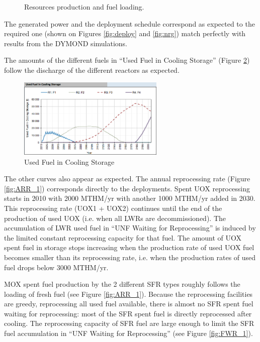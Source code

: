 \documentclass[12pt]{article}
\begin{document}
\begin{figure}[h!]
    \centering
    \caption{Resources production and fuel loading.\label{fig:ResourceUsed} }
\end{figure}

The generated power and the deployment schedule correspond as expected to the
required one (shown on Figures \ref{fig:deploy} and \ref{fig:nrg}) match
perfectly with results from the DYMOND simulations.

The amounts of the different fuels in ``Used Fuel in Cooling Storage'' (Figure
\ref{fig:UFCS_1}) follow the discharge of the different reactors as expected.

\begin{figure}[h!]
    \centering
    \includegraphics[width=0.62\textwidth]{img/usedFuelInCooling}
    \caption{Used Fuel in Cooling Storage}
    \label{fig:UFCS_1}
\end{figure}

The other curves also appear as expected. The annual reprocessing rate (Figure
\ref{fig:ARR_1}) corresponds directly to the deployments. Spent UOX
reprocessing starts in 2010 with 2000 MTHM/yr with another 1000 MTHM/yr added in
2030. This reprocessing rate (UOX1 + UOX2) continues until the end of the
production of used UOX (i.e. when all LWRs are decommissioned).
The accumulation of LWR used fuel in ``UNF Waiting for Reprocessing'' is induced
by the limited constant reprocessing capacity for that fuel. The amount of UOX
spent fuel in storage stops increasing when the production rate of used UOX fuel
becomes smaller than its reprocessing rate, i.e. when the production rates of used
fuel drops below $3000$ MTHM/yr.
 
MOX spent fuel production by the 2 different SFR types roughly follows the
loading of fresh fuel (see Figure \ref{fig:ARR_1}). Because the reprocessing
facilities are greedy, reprocessing all used fuel available, there is almost no
SFR spent fuel waiting for reprocessing: most of the SFR spent fuel is directly
reprocessed after cooling. The reprocessing capacity of SFR fuel are large
enough to limit the SFR fuel accumulation in ``UNF Waiting for Reprocessing''
(see Figure \ref{fig:FWR_1}).
\end{document}
